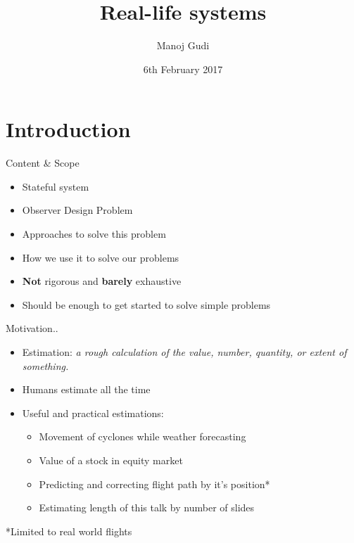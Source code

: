 \documentclass{beamer}
\title[Real-life systems]{Real-life systems}
\author{Manoj Gudi}
\institute{Ex-R.A. FOSSEE | CTO | Focus Analytics}
\date{6th February 2017}
\begin{document}
\begin{frame}
  \titlepage
\end{frame}


\section{Introduction}
\begin{frame}{Content \& Scope}
\begin{itemize}
  \item Stateful system
  \item Observer Design Problem
  \item Approaches to solve this problem
  \item How we use it to solve our problems
  \item \textbf{Not} rigorous and \textbf{barely} exhaustive
  \item Should be enough to get started to solve simple problems
\end{itemize}
\vskip 1cm
\end{frame}
\begin{frame}{Motivation..}

\begin{itemize}
  \item Estimation: \textit{a rough calculation of the value, number, quantity, or extent of something.}
  \item Humans estimate all the time
  \item Useful and practical estimations:
  \begin{itemize}
    \item Movement of cyclones while weather forecasting
    \item Value of a stock in equity market
    \item Predicting and correcting flight path by it's position*
    \item Estimating length of this talk by number of slides
  \end{itemize}
\end{itemize}
*Limited to real world flights
\vskip 1cm
\end{frame}
\end{document}
